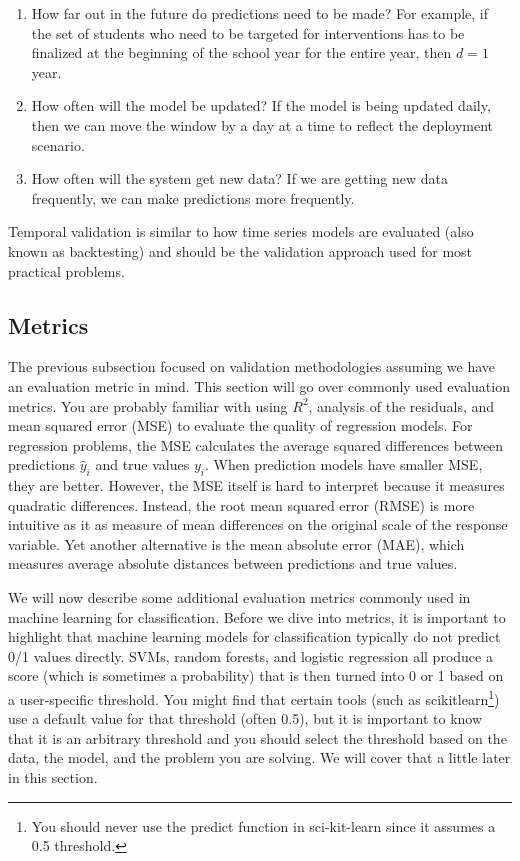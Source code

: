 \documentclass[]{krantz}
\begin{document}
\begin{enumerate}
\def\labelenumi{\arabic{enumi}.}
\item
  How far out in the future do predictions need to be made? For example,
  if the set of students who need to be targeted for interventions has
  to be finalized at the beginning of the school year for the entire
  year, then \(d = 1\) year.
\item
  How often will the model be updated? If the model is being updated
  daily, then we can move the window by a day at a time to reflect the
  deployment scenario.
\item
  How often will the system get new data? If we are getting new data
  frequently, we can make predictions more frequently.
\end{enumerate}

Temporal validation is similar to how time series models are evaluated
(also known as backtesting) and should be the validation approach used
for most practical problems.

\subsection{Metrics}\label{sec:7-7.2}

The previous subsection focused on validation methodologies assuming we
have an evaluation metric in mind. This section will go over commonly
used evaluation metrics. You are probably familiar with using \(R^2\),
analysis of the residuals, and mean squared error (MSE) to evaluate the
quality of regression models. For regression problems, the MSE
calculates the average squared differences between predictions
\(\hat{y}_i\) and true values \(y_i\). When prediction models have
smaller MSE, they are better. However, the MSE itself is hard to
interpret because it measures quadratic differences. Instead, the root
mean squared error (RMSE) is more intuitive as it as measure of mean
differences on the original scale of the response variable. Yet another
alternative is the mean absolute error (MAE), which measures average
absolute distances between predictions and true values.

We will now describe some additional evaluation metrics commonly used in
machine learning for classification. Before we dive into metrics, it is
important to highlight that machine learning models for classification
typically do not predict 0/1 values directly. SVMs, random forests, and
logistic regression all produce a score (which is sometimes a
probability) that is then turned into 0 or 1 based on a user-specific
threshold. You might find that certain tools (such as
scikitlearn\footnote{You should never use the predict function in
  sci-kit-learn since it assumes a 0.5 threshold.}) use a default value
for that threshold (often 0.5), but it is important to know that it is
an arbitrary threshold and you should select the threshold based on the
data, the model, and the problem you are solving. We will cover that a
little later in this section.
\end{document}
